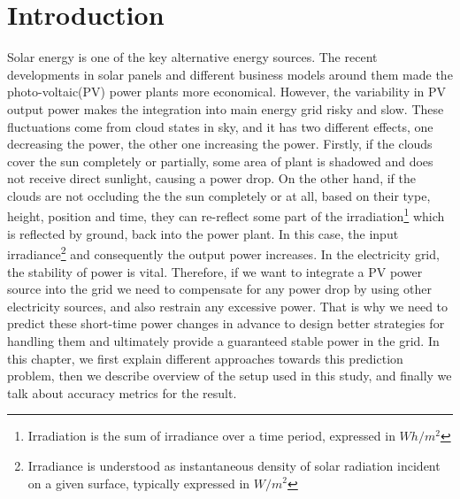 \newcommand{\package}{\emph}
\chapter{Introduction}
Solar energy is one of the key alternative energy sources. The recent developments in solar panels and different business models around them made the photo-voltaic(PV) power plants more economical. However, the variability in PV output power makes the integration into main energy grid risky and slow\cite{solar_variable}. These fluctuations come from cloud states in sky, and it has two different effects, one decreasing the power, the other one increasing the power. Firstly, if the clouds cover the sun completely or partially, some area of plant is shadowed and does not receive direct sunlight, causing a power drop. On the other hand, if the clouds are not occluding the the sun completely or at all, based on their type, height, position and time, they can re-reflect some part of the irradiation\footnote{Irradiation is the sum of irradiance over a time period, expressed in $Wh/m^2$} which is reflected by ground, back into the power plant. In this case, the input irradiance\footnote{Irradiance is understood as instantaneous density of solar radiation incident on a given surface, typically expressed in $W/m^2$} and consequently the output power increases. In the electricity grid, the stability of power is vital. Therefore, if we want to integrate a PV power source into the grid we need to compensate for any power drop by using other electricity sources, and also restrain any excessive power. That is why we need to predict these short-time power changes in advance to design better strategies for handling them and ultimately provide a guaranteed stable power in the grid. In this chapter, we first explain different approaches towards this prediction problem, then we describe overview of the setup used in this study, and finally we talk about accuracy metrics for the result. 


